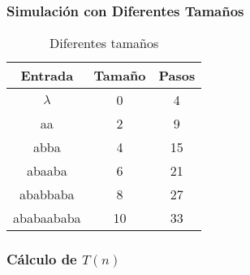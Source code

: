 \documentclass{uc3mpracticas}
\begin{document}
  \subsubsection{Simulación con Diferentes Tamaños}

  \begin{table}[!h]
    \centering
  \begin{tabular}{|c|c|c|}
  \hline

  \textbf{Entrada} & \textbf{Tamaño} & \textbf{Pasos} \\ \hline

  $\lambda$           & 0               & 4              \\ \hline
  aa               & 2               & 9              \\ \hline
  abba             & 4               & 15             \\ \hline
  abaaba           & 6               & 21             \\ \hline
  ababbaba         & 8               & 27             \\ \hline
  ababaababa       & 10              & 33             \\ \hline
  \end{tabular}
  \caption{Diferentes tamaños}
  \end{table}






  \subsubsection{Cálculo de $T(n)$}
\end{document}
